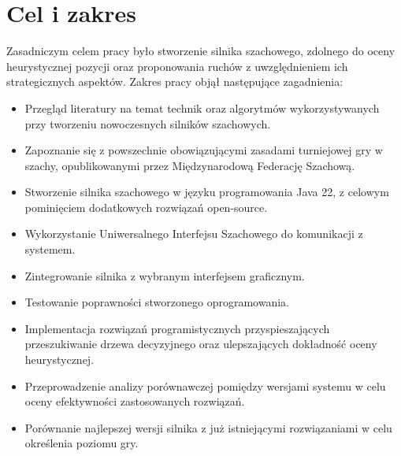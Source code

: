 \section{Cel i zakres}
\label{sec:cel-i-zakres}

Zasadniczym celem pracy było stworzenie silnika szachowego, zdolnego do oceny heurystycznej pozycji oraz proponowania ruchów z uwzględnieniem ich strategicznych aspektów.
Zakres pracy objął następujące zagadnienia:
\begin{itemize}
    \item Przegląd literatury na temat technik oraz algorytmów wykorzystywanych przy tworzeniu nowoczesnych silników szachowych.
    \item Zapoznanie się z powszechnie obowiązującymi zasadami turniejowej gry w szachy, opublikowanymi przez Międzynarodową Federację Szachową.
    \item Stworzenie silnika szachowego w języku programowania Java 22, z celowym pominięciem dodatkowych rozwiązań open-source.
    \item Wykorzystanie Uniwersalnego Interfejsu Szachowego do komunikacji z systemem.
    \item Zintegrowanie silnika z wybranym interfejsem graficznym.
    \item Testowanie poprawności stworzonego oprogramowania.
    \item Implementacja rozwiązań programistycznych przyspieszających przeszukiwanie drzewa decyzyjnego oraz ulepszających dokładność oceny heurystycznej.
    \item Przeprowadzenie analizy porównawczej pomiędzy wersjami systemu w celu oceny efektywności zastosowanych rozwiązań.
    \item Porównanie najlepszej wersji silnika z już istniejącymi rozwiązaniami w celu określenia poziomu gry.
\end{itemize}


